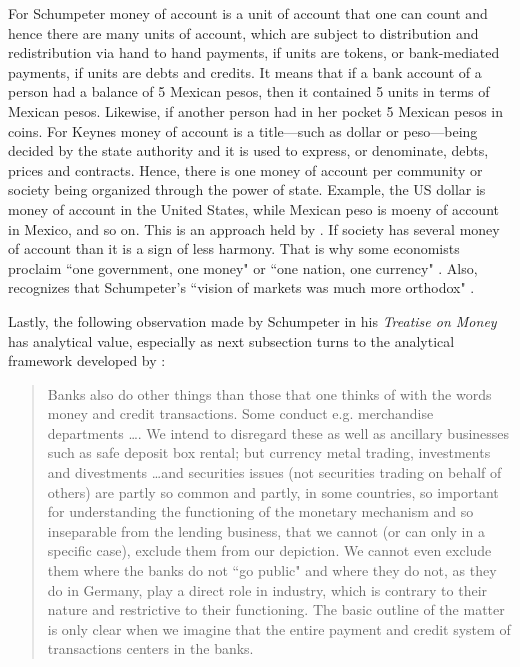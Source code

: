 For Schumpeter money of account is a unit of account that one can count and hence there are many units of account, which are subject to distribution and redistribution via hand to hand payments, if units are tokens, or bank-mediated payments, if units are debts and credits. It means that if a bank account of a person had a balance of 5 Mexican pesos, then it contained 5 units in terms of Mexican pesos. Likewise, if another person had in her pocket 5 Mexican pesos in coins. For Keynes money of account is a title---such as dollar or peso---being decided by the state authority and it is used to express, or denominate, debts, prices and contracts. Hence, there is one money of account per community or society being organized through the power of state. Example, the US dollar is money of account in the United States, while Mexican peso is moeny of account in Mexico, and so on. This is an approach held by \citeauthor{innes}. If society has several money of account than it is a sign of less harmony. That is why some economists proclaim ``one government, one money" \citep{goodhart2017} or ``one nation, one currency" \citep[pp.~41-42]{wray2012}. Also, \citeauthor{wray2009} recognizes that Schumpeter's ``vision of markets was much more orthodox" \citep[p.~810]{wray2009}.

Lastly, the following observation made by Schumpeter in his \textit{Treatise on Money} has analytical value, especially as next subsection turns to the analytical framework developed by \citeauthor{minsky1986}:

\begin{quote}
Banks also do other things than those that one thinks of with the words
money and credit transactions. Some conduct e.g. merchandise departments \dots. We intend to disregard these as well as ancillary businesses such as
safe deposit box rental; but currency metal trading, investments and divestments \dots and securities issues (not securities trading on behalf of others) are partly so common and partly, in some countries, so important for understanding the functioning of the monetary
mechanism and so inseparable from the lending business, that we cannot (or can
only in a specific case), exclude them from our depiction. We cannot even
exclude them where the banks do not ``go public" and where they do not, as they
do in Germany, play a direct role in industry, which is contrary to their nature
and restrictive to their functioning. The basic outline of the matter is only clear when we imagine that the entire payment and credit system of transactions centers in the banks.~\citep[p.~154]{schumpeter2014}
\end{quote}

